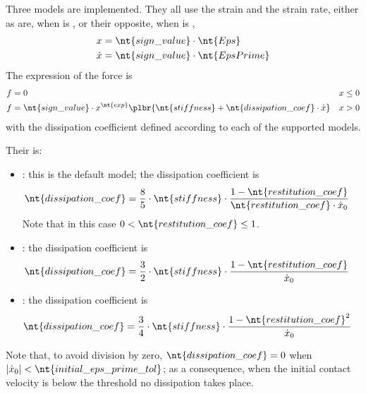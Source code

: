 Three models are implemented. They all use the strain and the strain rate, either as are, when  is ,
or their opposite, when  is ,
\begin{subequations}
\begin{align}
	x &= \nt{sign\_value} \cdot \nt{Eps}
	\\
	\dot{x} &= \nt{sign\_value} \cdot \nt{EpsPrime}
\end{align}
\end{subequations}
The expression of the force is
\begin{subequations}
\begin{align}
	f &= 0 && \text{$x \le 0$}
	\\
	f &= \nt{sign\_value} \cdot  x^{\nt{exp}} \plbr{ \nt{stiffness} + \nt{dissipation\_coef} \cdot \dot{x}} && \text{$x > 0$}
\end{align}
\end{subequations}
with the dissipation coefficient  defined according to each of the supported models.

Their  is:
\begin{itemize}
\item {} \cite{FLORES-2011-MUBO}: this is the default model; the dissipation coefficient is
\begin{align}
	\nt{dissipation\_coef} &= \frac{8}{5} \cdot \nt{stiffness} \cdot \frac{1 - \nt{restitution\_coef}}{\nt{restitution\_coef} \cdot \dot{x}_0}
\end{align}
Note that in this case $0 < \nt{restitution\_coef} \le 1$.

\item {} \cite{HUNT-1975}: the dissipation coefficient is
\begin{align}
	\nt{dissipation\_coef} &= \frac{3}{2} \cdot \nt{stiffness} \cdot \frac{1 - \nt{restitution\_coef}}{\dot{x}_0}
\end{align}

\item {} \cite{LANKARANI-1994-ND}: the dissipation coefficient is
\begin{align}
	\nt{dissipation\_coef} &= \frac{3}{4} \cdot \nt{stiffness} \cdot \frac{1 - \nt{restitution\_coef}^2}{\dot{x}_0}
\end{align}
\end{itemize}
Note that, to avoid division by zero, $\nt{dissipation\_coef} = 0$ when $|\dot{x}_0| < \nt{initial\_eps\_prime\_tol}$;
as a consequence, when the initial contact velocity is below the threshold no dissipation takes place.

